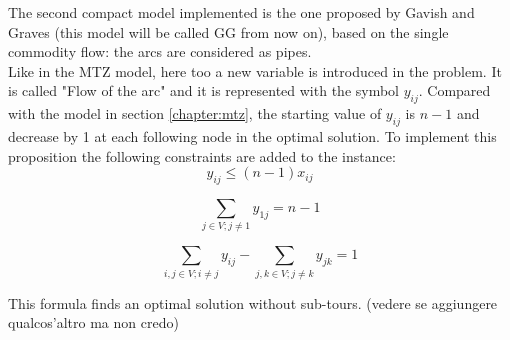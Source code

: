 The second compact model implemented is the one proposed by Gavish and Graves (this model will be called GG from now on), based on the single commodity flow:  the arcs are considered as pipes.\\
Like in the MTZ model, here too a new variable is introduced in the problem. It is called "Flow of the arc" and it is represented with the symbol $y_{ij}$. Compared with the model in section \ref{chapter:mtz}, the starting value of $y_{ij}$ is $n-1$ and decrease by 1 at each following node in the optimal solution. 
To implement this proposition the following constraints are added to the instance:
\begin{equation}
\label{eqn:linking}
y_{ij}\le (n-1)x_{ij}
\end{equation}

\begin{equation}
\label{eqn:flow_first}
\sum_{j\in V;j\not=1}y_{1j}=n-1
\end{equation}

\begin{equation}
\label{eqn:flows}
\sum_{i, j\in V;i\not=j}y_{ij}-\sum_{j, k \in V;j\not=k}y_{jk}=1
\end{equation}


This formula finds an optimal solution without sub-tours. (vedere se aggiungere qualcos'altro ma non credo)
